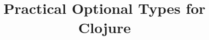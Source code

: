 \documentclass{llncs}
\newcounter{ex}
\begin{document}
\setlength{\pdfpageheight}{\paperheight}
\setlength{\pdfpagewidth}{\paperwidth}

%

\newcommand{\clj}[1]{\texttt{#1}}
\newcommand{\java}[1]{\texttt{#1}}
\newcommand{\rkt}[1]{\texttt{#1}}





\title{Practical Optional Types for Clojure}


\maketitle
\end{document}
